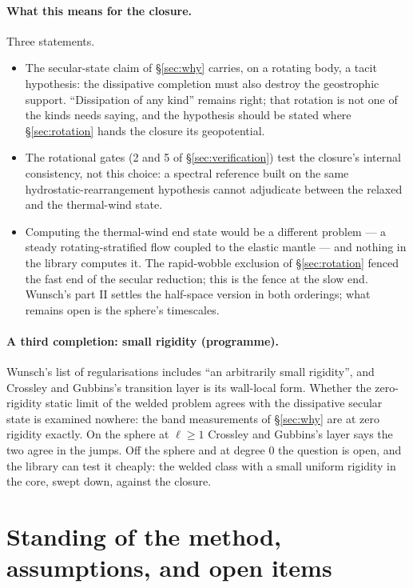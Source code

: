 \documentclass[11pt]{article}
\theoremstyle{definition}
\theoremstyle{remark}
\begin{document}
\paragraph{What this means for the closure.} Three statements.
\begin{itemize}
\item The secular-state claim of \S\ref{sec:why} carries, on a
  rotating body, a tacit hypothesis: the dissipative completion must
  also destroy the geostrophic support. ``Dissipation of any kind''
  remains right; that rotation is not one of the kinds needs saying,
  and the hypothesis should be stated where \S\ref{sec:rotation} hands
  the closure its geopotential.
\item The rotational gates (2 and 5 of \S\ref{sec:verification}) test
  the closure's internal consistency, not this choice: a spectral
  reference built on the same hydrostatic-rearrangement hypothesis
  cannot adjudicate between the relaxed and the thermal-wind state.
\item Computing the thermal-wind end state would be a different
  problem --- a steady rotating-stratified flow coupled to the elastic
  mantle --- and nothing in the library computes it. The rapid-wobble
  exclusion of \S\ref{sec:rotation} fenced the fast end of the secular
  reduction; this is the fence at the slow end. Wunsch's part II
  settles the half-space version in both orderings; what remains open
  is the sphere's timescales.
\end{itemize}

\paragraph{A third completion: small rigidity (programme).} Wunsch's
list of regularisations includes ``an arbitrarily small rigidity'',
and Crossley and Gubbins's transition layer is its wall-local form.
Whether the zero-rigidity static limit of the welded problem agrees
with the dissipative secular state is examined nowhere: the band
measurements of \S\ref{sec:why} are at zero rigidity exactly. On the
sphere at $\ell \ge 1$ Crossley and Gubbins's layer says the two agree
in the jumps. Off the sphere and at degree 0 the question is open, and
the library can test it cheaply: the welded class with a small uniform
rigidity in the core, swept down, against the closure.


\section{Standing of the method, assumptions, and open items}
\label{sec:standing}
\label{sec:open}
\end{document}
